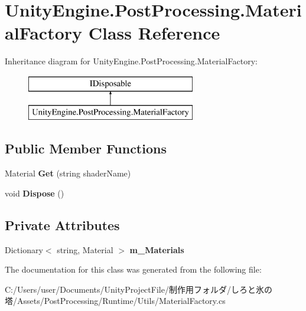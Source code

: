 \hypertarget{class_unity_engine_1_1_post_processing_1_1_material_factory}{}\section{Unity\+Engine.\+Post\+Processing.\+Material\+Factory Class Reference}
\label{class_unity_engine_1_1_post_processing_1_1_material_factory}
Inheritance diagram for Unity\+Engine.\+Post\+Processing.\+Material\+Factory\+:\begin{figure}[H]
\begin{center}
\leavevmode
\includegraphics[height=2.000000cm]{class_unity_engine_1_1_post_processing_1_1_material_factory}
\end{center}
\end{figure}
\subsection*{Public Member Functions}
\begin{DoxyCompactItemize}
\item 
\mbox{\label{class_unity_engine_1_1_post_processing_1_1_material_factory_a0805118c985df795d8b2941f30e3845d}} 
Material {\bfseries Get} (string shader\+Name)
\item 
\mbox{\label{class_unity_engine_1_1_post_processing_1_1_material_factory_a5fe3244955fe950b377611e57b2f10ae}} 
void {\bfseries Dispose} ()
\end{DoxyCompactItemize}
\subsection*{Private Attributes}
\begin{DoxyCompactItemize}
\item 
\mbox{\label{class_unity_engine_1_1_post_processing_1_1_material_factory_a4be5533c27297ca825a61d9813196f29}} 
Dictionary$<$ string, Material $>$ {\bfseries m\+\_\+\+Materials}
\end{DoxyCompactItemize}


The documentation for this class was generated from the following file\+:\begin{DoxyCompactItemize}
\item 
C\+:/\+Users/user/\+Documents/\+Unity\+Project\+File/制作用フォルダ/しろと氷の塔/\+Assets/\+Post\+Processing/\+Runtime/\+Utils/Material\+Factory.\+cs\end{DoxyCompactItemize}
